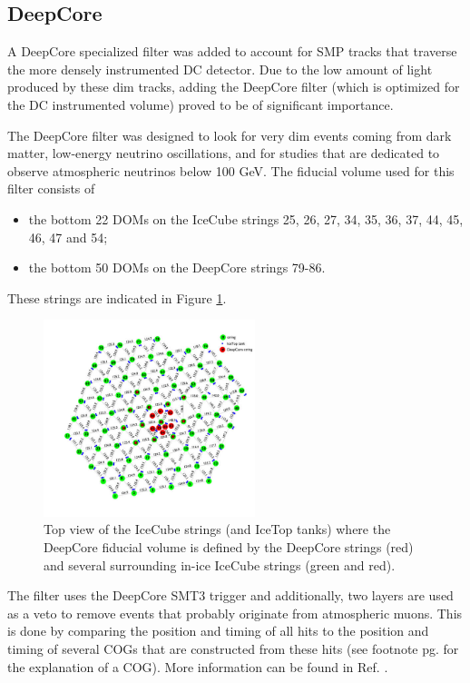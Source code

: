 \subsection{DeepCore}
A DeepCore specialized filter was added to account for SMP tracks that traverse the more densely instrumented DC detector. Due to the low amount of light produced by these dim tracks, adding the DeepCore filter (which is optimized for the DC instrumented volume) proved to be of significant importance.

The DeepCore filter was designed to look for very dim events coming from dark matter, low-energy neutrino oscillations, and for studies that are dedicated to observe atmospheric neutrinos below 100 GeV. The fiducial volume used for this filter consists of
\vspace{2mm}
\begin{itemize}
\item the bottom 22 DOMs on the IceCube strings 25, 26, 27, 34, 35, 36, 37, 44, 45, 46, 47 and 54;
\item the bottom 50 DOMs on the DeepCore strings 79-86.
\end{itemize}
\vspace{2mm}
These strings are indicated in Figure \ref{fig:deepcorestrings}.\\

\begin{figure}[t]
\centering
\includegraphics[width=0.55\textwidth]{chapter8/img/stringview.jpg}
\caption{Top view of the IceCube strings (and IceTop tanks) where the DeepCore fiducial volume is defined by the DeepCore strings (red) and several surrounding in-ice IceCube strings (green and red).}
\label{fig:deepcorestrings}
\end{figure}

\noindent The filter uses the DeepCore SMT3 trigger and additionally, two layers are used as a veto to remove events that probably originate from atmospheric muons. This is done by comparing the position and timing of all hits to the position and timing of several COGs that are constructed from these hits (see footnote pg. \pageref{footnote:cog} for the explanation of a COG). More information can be found in Ref. \cite{DeepCore2012}.


